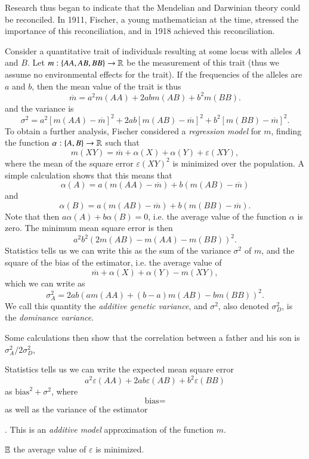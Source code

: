 Research thus began to indicate that the Mendelian and Darwinian theory could be reconciled. In 1911, Fischer, a young mathematician at the time, stressed the importance of this reconciliation, and in 1918 achieved this reconciliation.

Consider a quantitative trait of individuals resulting at some locus with alleles $A$ and $B$. Let $m: \{ AA, AB, BB \} \to \operatorname{\mathbb{R}}$ be the measurement of this trait (thus we assume no environmental effects for the trait). If the frequencies of the alleles are $a$ and $b$, then the mean value of the trait is thus
%
\[ \overline{m} = a^2 m(AA) + 2ab m(AB) + b^2 m(BB). \]
%
and the variance is
%
\[ \sigma^2 = a^2 [ m(AA) - \overline{m} ]^2 + 2ab [ m(AB) - \overline{m} ]^2 + b^2 [ m(BB) - \overline{m} ]^2. \]
%
To obtain a further analysis, Fischer considered a \emph{regression model} for $m$, finding the function $\alpha: \{ A, B \} \to \operatorname{\mathbb{R}}$ such that
%
\[ m(XY) = \overline{m} + \alpha(X) + \alpha(Y) + \varepsilon(XY), \]
%
where the mean of the square error $\varepsilon(XY)^2$ is minimized over the population. A simple calculation shows that this means that
%
\[ \alpha(A) = a( m(AA) - \overline{m} ) + b( m(AB) - \overline{m} ) \]
%
and
%
\[ \alpha(B) = a ( m(AB) - \overline{m} ) + b ( m(BB) - \overline{m} ). \]
%
Note that then $a \alpha(A) + b \alpha(B) = 0$, i.e. the average value of the function $\alpha$ is zero. The minimum mean square error is then
%
\[ a^2 b^2 ( 2 m(AB) - m(AA) - m(BB) )^2. \]
%
Statistics tells us we can write this as the sum of the variance $\sigma^2$ of $m$, and the square of the bias of the estimator, i.e. the average value of
%
\[ \overline{m} + \alpha(X) + \alpha(Y) - m(XY), \]
%
which we can write as
%
\[ \sigma_A^2 = 2ab ( a m(AA) + (b - a) m(AB) - b m(BB) )^2. \]
%
We call this quantity the \emph{additive genetic variance}, and $\sigma^2$, also denoted $\sigma_D^2$, is the \emph{dominance variance}.

Some calculations then show that the correlation between a father and his son is $\sigma_A^2 / 2 \sigma_D^2$,


 Statistics tells us we can write the expected mean square error
%
\[ a^2 \varepsilon(AA) + 2ab \varepsilon(AB) + b^2 \varepsilon(BB) \]
%
as $\text{bias}^2 + \sigma^2$, where
%
\[ \text{bias} =  \]
%
as well as the variance of the estimator

. This is an \emph{additive model} approximation of the function $m$.

$\operatorname{\mathbb{E}}$ the average value of $\varepsilon$ is minimized.

